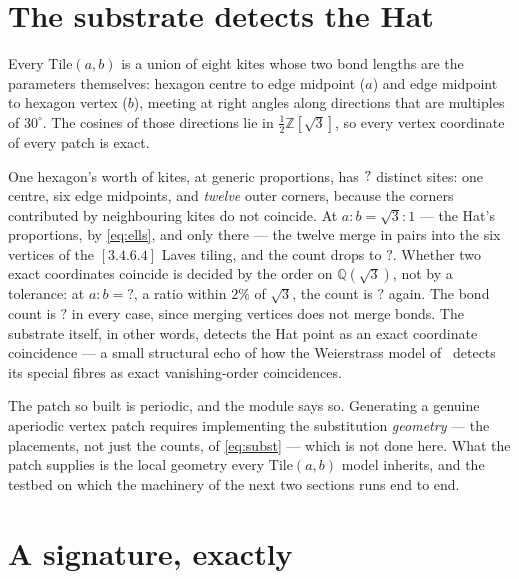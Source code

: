 \documentclass[11pt,a4paper]{article}
\newcommand{\MTSitesHat}{?}\newcommand{\MTSitesOff}{?}
\newcommand{\MTBondsHex}{?}\newcommand{\MTOffRatio}{?}
\newcommand{\QQ}{\mathbb{Q}}
\newcommand{\ZZ}{\mathbb{Z}}
\theoremstyle{definition}
\begin{document}

\section{The substrate detects the Hat}
\label{sec:substrate}

Every Tile$(a,b)$ is a union of eight kites whose two bond lengths are the
parameters themselves: hexagon centre to edge midpoint ($a$) and edge
midpoint to hexagon vertex ($b$), meeting at right angles along directions
that are multiples of $30^\circ$. The cosines of those directions lie in
$\tfrac12\ZZ[\sqrt3]$, so every vertex coordinate of every patch is exact.

One hexagon's worth of kites, at generic proportions, has
$?$ distinct sites: one centre, six edge midpoints, and
\emph{twelve} outer corners, because the corners contributed by neighbouring
kites do not coincide. At $a : b = \sqrt3 : 1$ --- the Hat's proportions,
by \cref{eq:ells}, and only there --- the twelve merge in pairs into the six
vertices of the $[3.4.6.4]$ Laves tiling, and the count drops to
$\MTSitesHat$. Whether two exact coordinates coincide is decided by the
order on $\QQ(\sqrt3)$, not by a tolerance: at $a : b = \MTOffRatio$, a
ratio within $2\%$ of $\sqrt3$, the count is $\MTSitesOff$ again. The bond
count is $\MTBondsHex$ in every case, since merging vertices does not merge
bonds. The substrate itself, in other words, detects the Hat point as an
exact coordinate coincidence --- a small structural echo of how the
Weierstrass model of~\cite{SuppStrings} detects its special fibres as exact
vanishing-order coincidences.

The patch so built is periodic, and the module says so. Generating a genuine
aperiodic vertex patch requires implementing the substitution
\emph{geometry} --- the placements, not just the counts, of
\cref{eq:subst} --- which is not done here. What the patch supplies is the
local geometry every Tile$(a,b)$ model inherits, and the testbed on which
the machinery of the next two sections runs end to end.


\section{A signature, exactly}
\label{sec:signature}
\end{document}
